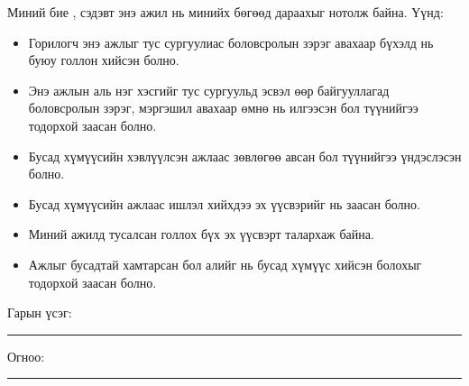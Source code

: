 \begin{declaration}
\addchaptertocentry{\authorshipname}

\noindent Миний бие \shortname, {\ttitle} сэдэвт энэ ажил нь минийх бөгөөд дараахыг нотолж байна. Үүнд:

\begin{itemize}
\item Горилогч энэ ажлыг тус сургуулиас боловсролын зэрэг авахаар бүхэлд нь буюу голлон хийсэн болно.
\item Энэ ажлын аль нэг хэсгийг тус сургуульд эсвэл өөр байгууллагад боловсролын зэрэг, мэргэшил авахаар өмнө нь илгээсэн бол түүнийгээ тодорхой заасан болно.
\item Бусад хүмүүсийн хэвлүүлсэн ажлаас зөвлөгөө авсан бол түүнийгээ үндэслэсэн болно.
\item Бусад хүмүүсийн ажлаас ишлэл хийхдээ эх үүсвэрийг нь заасан болно.
\item Миний ажилд тусалсан голлох бүх эх үүсвэрт талархаж байна.
\item Ажлыг бусадтай хамтарсан бол алийг нь бусад хүмүүс хийсэн болохыг тодорхой заасан болно.
\end{itemize}
\bigskip

\noindent Гарын үсэг: \rule[-0.5em]{12.7em}{0.5pt}
\bigskip

\noindent Огноо: \rule[-0.5em]{15em}{0.5pt}

\end{declaration}

\clearpage
